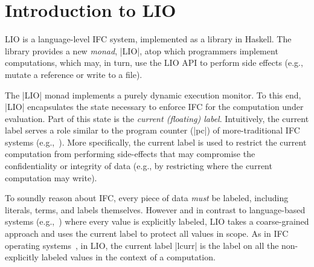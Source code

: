 \section{Introduction to LIO}
\label{sec:background}

LIO is a language-level IFC system, implemented as a library in
Haskell.  The library provides a new \emph{monad}, |LIO|, atop which
programmers implement computations, which may, in turn, use the LIO
API to perform side effects (e.g., mutate a reference or write to a
file).
%
%
%

The |LIO| monad implements a purely dynamic execution monitor.
%
To this end, |LIO| encapsulates the state necessary to enforce
IFC for the computation under evaluation.
%
Part of this state is the \emph{current (floating) label}.
%
Intuitively, the current label serves a role similar to the program
counter (|pc|) of more-traditional IFC systems (e.g.,~\cite{FlowCaml}).
%
More specifically, the current label is used to restrict the current
computation from performing side-effects that may compromise the
confidentiality or integrity of data (e.g., by restricting where the
current computation may write).

%
%

To soundly reason about IFC, every piece of data \emph{must} be
labeled, including literals, terms, and labels themselves.
%
%
However and in contrast to language-based systems
(e.g.,~\cite{myers:jif, FlowCaml, Breeze}) where every value is
explicitly labeled,
%
LIO takes a coarse-grained approach and uses the current label to protect all
values in scope.
%
As in IFC operating systems~\cite{Efstathopoulos:2005,
zeldovich:histar}, in LIO, the current label |lcurr| is the label on
all the non-explicitly labeled values in the context of a computation.
%
%

